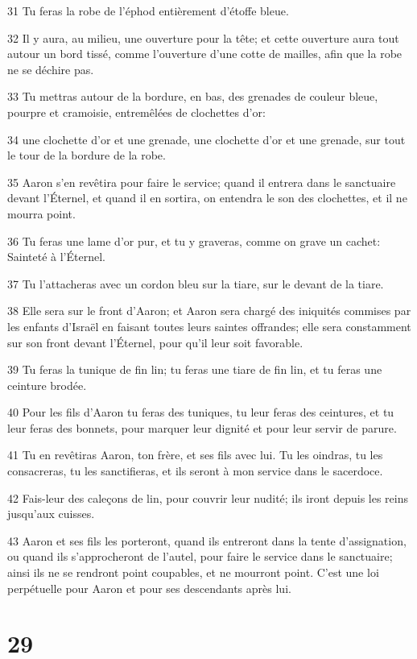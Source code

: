 \par 31 Tu feras la robe de l'éphod entièrement d'étoffe bleue.
\par 32 Il y aura, au milieu, une ouverture pour la tête; et cette ouverture aura tout autour un bord tissé, comme l'ouverture d'une cotte de mailles, afin que la robe ne se déchire pas.
\par 33 Tu mettras autour de la bordure, en bas, des grenades de couleur bleue, pourpre et cramoisie, entremêlées de clochettes d'or:
\par 34 une clochette d'or et une grenade, une clochette d'or et une grenade, sur tout le tour de la bordure de la robe.
\par 35 Aaron s'en revêtira pour faire le service; quand il entrera dans le sanctuaire devant l'Éternel, et quand il en sortira, on entendra le son des clochettes, et il ne mourra point.
\par 36 Tu feras une lame d'or pur, et tu y graveras, comme on grave un cachet: Sainteté à l'Éternel.
\par 37 Tu l'attacheras avec un cordon bleu sur la tiare, sur le devant de la tiare.
\par 38 Elle sera sur le front d'Aaron; et Aaron sera chargé des iniquités commises par les enfants d'Israël en faisant toutes leurs saintes offrandes; elle sera constamment sur son front devant l'Éternel, pour qu'il leur soit favorable.
\par 39 Tu feras la tunique de fin lin; tu feras une tiare de fin lin, et tu feras une ceinture brodée.
\par 40 Pour les fils d'Aaron tu feras des tuniques, tu leur feras des ceintures, et tu leur feras des bonnets, pour marquer leur dignité et pour leur servir de parure.
\par 41 Tu en revêtiras Aaron, ton frère, et ses fils avec lui. Tu les oindras, tu les consacreras, tu les sanctifieras, et ils seront à mon service dans le sacerdoce.
\par 42 Fais-leur des caleçons de lin, pour couvrir leur nudité; ils iront depuis les reins jusqu'aux cuisses.
\par 43 Aaron et ses fils les porteront, quand ils entreront dans la tente d'assignation, ou quand ils s'approcheront de l'autel, pour faire le service dans le sanctuaire; ainsi ils ne se rendront point coupables, et ne mourront point. C'est une loi perpétuelle pour Aaron et pour ses descendants après lui.

\chapter{29}

